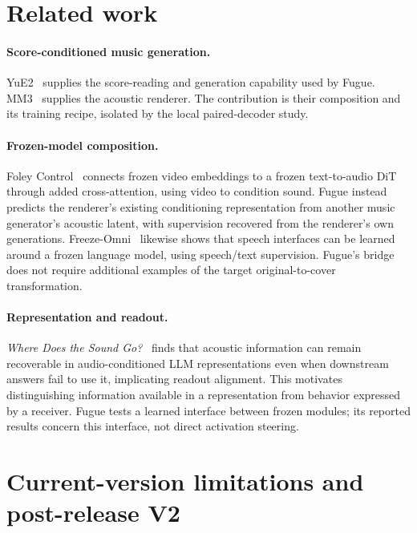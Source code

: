 \documentclass[11pt,a4paper]{article}
\begin{document}
\section{Related work}

\paragraph{Score-conditioned music generation.} YuE2~\cite{yue2} supplies the score-reading and generation capability used by Fugue. MM3~\cite{mm3} supplies the acoustic renderer. The contribution is their composition and its training recipe, isolated by the local paired-decoder study.

\paragraph{Frozen-model composition.} Foley Control~\cite{foleycontrol} connects frozen video embeddings to a frozen text-to-audio DiT through added cross-attention, using video to condition sound. Fugue instead predicts the renderer's existing conditioning representation from another music generator's acoustic latent, with supervision recovered from the renderer's own generations. Freeze-Omni~\cite{freezeomni} likewise shows that speech interfaces can be learned around a frozen language model, using speech/text supervision. Fugue's bridge does not require additional examples of the target original-to-cover transformation.

\paragraph{Representation and readout.} \emph{Where Does the Sound Go?}~\cite{soundgo} finds that acoustic information can remain recoverable in audio-conditioned LLM representations even when downstream answers fail to use it, implicating readout alignment. This motivates distinguishing information available in a representation from behavior expressed by a receiver. Fugue tests a learned interface between frozen modules; its reported results concern this interface, not direct activation steering.

\section{Current-version limitations and post-release V2}
\end{document}
